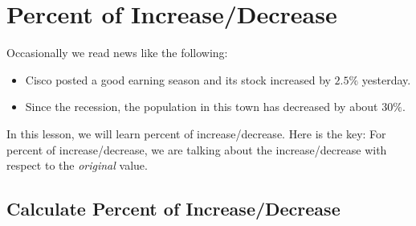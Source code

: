 
\section{Percent of Increase/Decrease}

Occasionally we read news like the following:

\begin{itemize}
\item Cisco posted a good earning season and its stock increased by $2.5\%$ yesterday.
\item Since the recession, the population in this town has decreased by about $30\%$.
\end{itemize}

In this lesson, we will learn percent of increase/decrease. Here is the key: For percent of increase/decrease, we are talking about the increase/decrease with respect to the \textit{original} value.

\subsection{Calculate Percent of Increase/Decrease}

